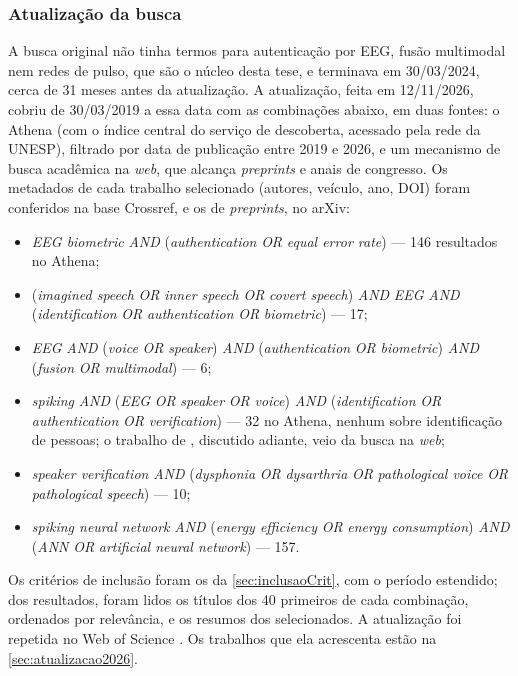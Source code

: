 			\subsubsection{Atualização da busca}
			\label{sec:atualizacaoBusca}

			\par A busca original não tinha termos para autenticação por \ac{EEG}, fusão multimodal nem redes de pulso, que são o núcleo desta tese, e terminava em 30/03/2024, cerca de 31 meses antes da atualização. A atualização, feita em 12/11/2026, cobriu de 30/03/2019 a essa data com as combinações abaixo, em duas fontes: o Athena (com o índice central do serviço de descoberta, acessado pela rede da UNESP), filtrado por data de publicação entre 2019 e 2026, e um mecanismo de busca acadêmica na \textit{web}, que alcança \textit{preprints} e anais de congresso. Os metadados de cada trabalho selecionado (autores, veículo, ano, DOI) foram conferidos na base Crossref, e os de \textit{preprints}, no arXiv:
			\begin{itemize}
				\item \textit{EEG biometric} \textit{AND} (\textit{authentication} \textit{OR} \textit{equal error rate}) --- 146 resultados no Athena;
				\item (\textit{imagined speech} \textit{OR} \textit{inner speech} \textit{OR} \textit{covert speech}) \textit{AND} \textit{EEG} \textit{AND} (\textit{identification} \textit{OR} \textit{authentication} \textit{OR} \textit{biometric}) --- 17;
				\item \textit{EEG} \textit{AND} (\textit{voice} \textit{OR} \textit{speaker}) \textit{AND} (\textit{authentication} \textit{OR} \textit{biometric}) \textit{AND} (\textit{fusion} \textit{OR} \textit{multimodal}) --- 6;
				\item \textit{spiking} \textit{AND} (\textit{EEG} \textit{OR} \textit{speaker} \textit{OR} \textit{voice}) \textit{AND} (\textit{identification} \textit{OR} \textit{authentication} \textit{OR} \textit{verification}) --- 32 no Athena, nenhum sobre identificação de pessoas; o trabalho de , discutido adiante, veio da busca na \textit{web};
				\item \textit{speaker verification} \textit{AND} (\textit{dysphonia} \textit{OR} \textit{dysarthria} \textit{OR} \textit{pathological voice} \textit{OR} \textit{pathological speech}) --- 10;
				\item \textit{spiking neural network} \textit{AND} (\textit{energy efficiency} \textit{OR} \textit{energy consumption}) \textit{AND} (\textit{ANN} \textit{OR} \textit{artificial neural network}) --- 157.
			\end{itemize}
			\par Os critérios de inclusão foram os da \autoref{sec:inclusaoCrit}, com o período estendido; dos resultados, foram lidos os títulos dos 40 primeiros de cada combinação, ordenados por relevância, e os resumos dos selecionados. A atualização foi repetida no Web of Science . Os trabalhos que ela acrescenta estão na \autoref{sec:atualizacao2026}.

